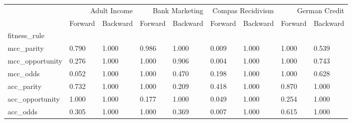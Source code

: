 \begin{tabular}{lllllllll}
\toprule
 & \multicolumn{2}{r}{Adult Income} & \multicolumn{2}{r}{Bank Marketing} & \multicolumn{2}{r}{Compas Recidivism} & \multicolumn{2}{r}{German Credit} \\
 & Forward & Backward & Forward & Backward & Forward & Backward & Forward & Backward \\
fitness_rule &  &  &  &  &  &  &  &  \\
\midrule
mcc_parity & 0.790 & 1.000 & 0.986 & 1.000 & 0.009 & 1.000 & 1.000 & 0.539 \\
mcc_opportunity & 0.276 & 1.000 & 1.000 & 0.906 & 0.004 & 1.000 & 1.000 & 0.743 \\
mcc_odds & 0.052 & 1.000 & 1.000 & 0.470 & 0.198 & 1.000 & 1.000 & 0.628 \\
acc_parity & 0.732 & 1.000 & 1.000 & 0.209 & 0.418 & 1.000 & 0.870 & 1.000 \\
acc_opportunity & 1.000 & 1.000 & 0.177 & 1.000 & 0.049 & 1.000 & 0.254 & 1.000 \\
acc_odds & 0.305 & 1.000 & 1.000 & 0.369 & 0.007 & 1.000 & 0.615 & 1.000 \\
\bottomrule
\end{tabular}
